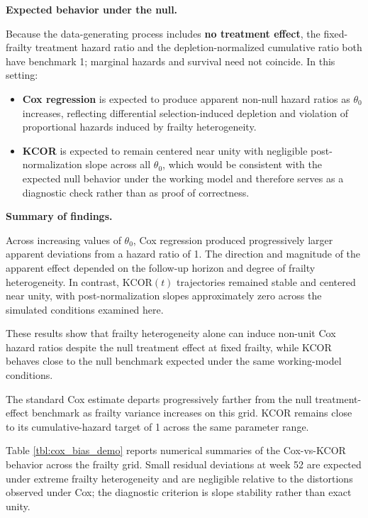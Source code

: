 \documentclass[
]{article}
\providecommand{\tightlist}{%
  \setlength{\itemsep}{0pt}\setlength{\parskip}{0pt}}
\begin{document}
\textbf{Expected behavior under the null.}

Because the data-generating process includes \textbf{no treatment effect}, the fixed-frailty treatment hazard ratio and the depletion-normalized cumulative ratio both have benchmark 1; marginal hazards and survival need not coincide. In this setting:

\begin{itemize}
\tightlist
\item
  \textbf{Cox regression} is expected to produce apparent non-null hazard ratios as \(\theta_0\) increases, reflecting differential selection-induced depletion and violation of proportional hazards induced by frailty heterogeneity.
\item
  \textbf{KCOR} is expected to remain centered near unity with negligible post-normalization slope across all \(\theta_0\), which would be consistent with the expected null behavior under the working model and therefore serves as a diagnostic check rather than as proof of correctness.
\end{itemize}

\textbf{Summary of findings.}

Across increasing values of \(\theta_0\), Cox regression produced progressively larger apparent deviations from a hazard ratio of 1. The direction and magnitude of the apparent effect depended on the follow-up horizon and degree of frailty heterogeneity. In contrast, \(\mathrm{KCOR}(t)\) trajectories remained stable and centered near unity, with post-normalization slopes approximately zero across the simulated conditions examined here.

These results show that frailty heterogeneity alone can induce non-unit Cox hazard ratios despite the null treatment effect at fixed frailty, while KCOR behaves close to the null benchmark expected under the same working-model conditions.

The standard Cox estimate departs progressively farther from the null treatment-effect benchmark as frailty variance increases on this grid. KCOR remains close to its cumulative-hazard target of 1 across the same parameter range.

Table \ref{tbl:cox_bias_demo} reports numerical summaries of the Cox-vs-KCOR behavior across the frailty grid. Small residual deviations at week 52 are expected under extreme frailty heterogeneity and are negligible relative to the distortions observed under Cox; the diagnostic criterion is slope stability rather than exact unity.
\end{document}
